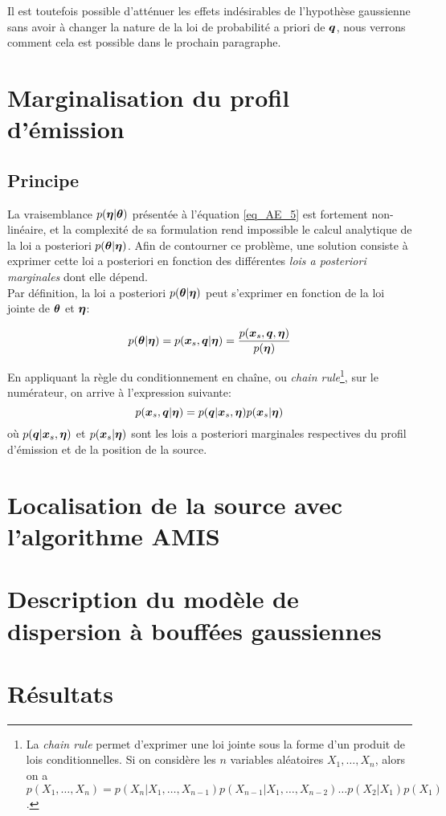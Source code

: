 Il est toutefois possible d'atténuer les effets indésirables de l'hypothèse gaussienne sans avoir à changer la nature de la loi de probabilité a priori de ${\bm{q}}$, nous verrons comment cela est possible dans le prochain paragraphe.


\section{Marginalisation du profil d'émission}

\subsection{Principe}
La vraisemblance $p({\bm{\eta}}|{\bm{\theta}})$ présentée à l'équation \eqref{eq_AE_5} est fortement non-linéaire, et la complexité de sa formulation rend impossible le calcul analytique de la loi a posteriori $p({\bm{\theta}} | {\bm{\eta}})$. Afin de contourner ce problème, une solution consiste à exprimer cette loi a posteriori en fonction des différentes \textit{lois a posteriori marginales} dont elle dépend. \\

Par définition, la loi a posteriori $p({\bm{\theta}}|{\bm{\eta}})$ peut s'exprimer en fonction de la loi jointe de ${\bm{\theta}}$ et ${\bm{\eta}}$:

\begin{equation}
p({\bm{\theta}}|{\bm{\eta}}) = p({\bm{x}_s}, {\bm{q}} | {\bm{\eta}}) = \dfrac{p({\bm{x}_s}, {\bm{q}}, {\bm{\eta}})}{p({\bm{\eta}})}
\label{eq_conditionalite}
\end{equation}

En appliquant la règle du conditionnement en chaîne, ou \textit{chain rule}\footnote{La \textit{chain rule} permet d'exprimer une loi jointe sous la forme d'un produit de lois conditionnelles. Si on considère les $n$ variables aléatoires $X_1, \dots, X_n$, alors on a $p(X_1, \dots, X_n) = p(X_n|X_1, \dots, X_{n-1})p(X_{n-1}|X_1, \dots, X_{n-2})\dots p(X_2|X_1)p(X_1)$.}, sur le numérateur, on arrive à l'expression suivante:
\begin{equation}
p({\bm{x}_s}, {\bm{q}} | {\bm{\eta}}) = p({\bm{q}} | {\bm{x}_s}, {\bm{\eta}})p({\bm{x}_s} | {\bm{\eta}})
\label{eq_AE_9}
\end{equation}
où $p({\bm{q}} | {\bm{x}_s}, {\bm{\eta}})$ et $p({\bm{x}_s} | {\bm{\eta}})$ sont les lois a posteriori marginales respectives du profil d'émission et de la position de la source. \\



\section{Localisation de la source avec l'algorithme AMIS}

\section{Description du modèle de dispersion à bouffées gaussiennes}

\section{Résultats}